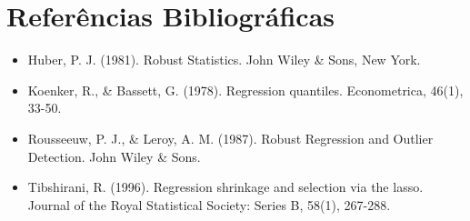 \documentclass[10pt,a4paper,journal]{article}
\begin{document}
\section{Referências Bibliográficas}
\begin{itemize}
\item Huber, P. J. (1981). Robust Statistics. John Wiley \& Sons, New York.
\end{itemize}
\begin{itemize}
\item Koenker, R., \& Bassett, G. (1978). Regression quantiles. Econometrica, 46(1), 33-50.
\end{itemize}
\begin{itemize}
\item Rousseeuw, P. J., \& Leroy, A. M. (1987). Robust Regression and Outlier Detection. John Wiley \& Sons.
\end{itemize}
\begin{itemize}
\item Tibshirani, R. (1996). Regression shrinkage and selection via the lasso. Journal of the Royal Statistical Society: Series B, 58(1), 267-288.
\end{itemize}
\end{document}
